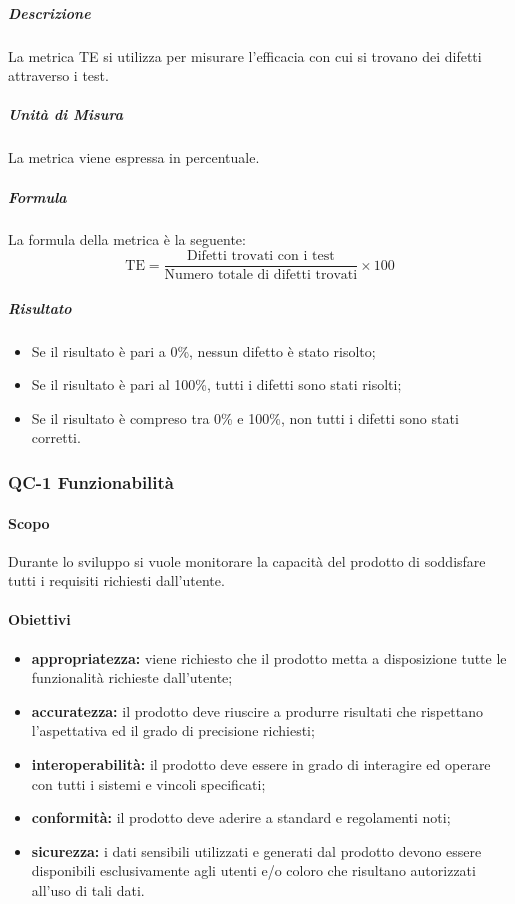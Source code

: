 				\subparagraph{Descrizione}
				La metrica TE si utilizza per misurare l'efficacia con cui si trovano dei difetti attraverso i test.

				\subparagraph{Unità di Misura}
				La metrica viene espressa in percentuale.

				\subparagraph{Formula}
				La formula della metrica è la seguente:
				\[
					\text{TE} = \frac{\text{Difetti trovati con i test}}{\text{Numero totale di difetti trovati}} \times 100
				\]

				\subparagraph{Risultato}
				\begin{itemize}
					\item Se il risultato è pari a 0\%, nessun difetto è stato risolto;
					\item Se il risultato è pari al 100\%, tutti i difetti sono stati risolti;
					\item Se il risultato è compreso tra 0\% e 100\%, non tutti i difetti sono stati corretti.
				\end{itemize}

		\subsubsection{QC-1 Funzionabilità}
			\paragraph{Scopo}
				Durante lo sviluppo si vuole monitorare la capacità del prodotto di soddisfare tutti i requisiti richiesti dall'utente.
			\paragraph{Obiettivi}
				\begin{itemize}
					\item \textbf{appropriatezza:} viene richiesto che il prodotto metta a disposizione tutte le funzionalità richieste dall'utente;
					\item \textbf{accuratezza:} il prodotto deve riuscire a produrre risultati che rispettano l'aspettativa ed il grado di precisione richiesti;
					\item \textbf{interoperabilità:} il prodotto deve essere in grado di interagire ed operare con tutti i sistemi e vincoli specificati;
					\item \textbf{conformità:} il prodotto deve aderire a standard e regolamenti noti;
					\item \textbf{sicurezza:} i dati sensibili utilizzati e generati dal prodotto devono essere disponibili esclusivamente agli utenti e/o coloro che risultano autorizzati all'uso di tali dati.
				\end{itemize}	
